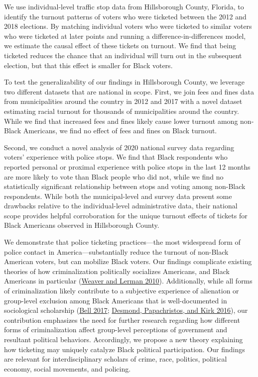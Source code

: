 \documentclass[
  12pt,
]{article}
\begin{document}
We use individual-level traffic stop data from Hillsborough County, Florida, to identify the turnout patterns of voters who were ticketed between the 2012 and 2018 elections. By matching individual voters who were ticketed to similar voters who were ticketed at later points and running a difference-in-differences model, we estimate the causal effect of these tickets on turnout. We find that being ticketed reduces the chance that an individual will turn out in the subsequent election, but that this effect is smaller for Black voters.

To test the generalizability of our findings in Hillsborough County, we leverage two different datasets that are national in scope. First, we join fees and fines data from municipalities around the country in 2012 and 2017 with a novel dataset estimating racial turnout for thousands of municipalities around the country. While we find that increased fees and fines likely cause lower turnout among non-Black Americans, we find no effect of fees and fines on Black turnout.

Second, we conduct a novel analysis of 2020 national survey data regarding voters' experience with police stops. We find that Black respondents who reported personal or proximal experience with police stops in the last 12 months are more likely to vote than Black people who did not, while we find no statistically significant relationship between stops and voting among non-Black respondents. While both the municipal-level and survey data present some drawbacks relative to the individual-level administrative data, their national scope provides helpful corroboration for the unique turnout effects of tickets for Black Americans observed in Hillsborough County.

We demonstrate that police ticketing practices---the most widespread form of police contact in America---substantially reduce the turnout of non-Black American voters, but can mobilize Black voters. Our findings complicate existing theories of how criminalization politically socializes Americans, and Black Americans in particular (\protect\hyperlink{ref-Weaver2010}{Weaver and Lerman 2010}). Additionally, while all forms of criminalization likely contribute to a subjective experience of alienation or group-level exclusion among Black Americans that is well-documented in sociological scholarship (\protect\hyperlink{ref-Bell2017}{Bell 2017}; \protect\hyperlink{ref-Desmond2016}{Desmond, Papachristos, and Kirk 2016}), our contribution emphasizes the need for further research regarding how different forms of criminalization affect group-level perceptions of government and resultant political behaviors. Accordingly, we propose a new theory explaining how ticketing may uniquely catalyze Black political participation. Our findings are relevant for interdisciplinary scholars of crime, race, politics, political economy, social movements, and policing.
\end{document}
